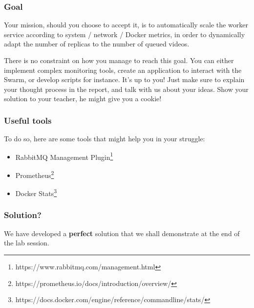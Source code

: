 \documentclass[a4paper,11pt]{exam}
\begin{document}
\subsubsection{Goal}

Your mission, should you choose to accept it, is to automatically scale the worker service according to system / network / Docker metrics, in order to dynamically adapt the number of replicas to the number of queued videos.

There is no constraint on how you manage to reach this goal.
You can either implement complex monitoring tools, create an application to interact with the Swarm, or develop scripts for instance.
It's up to you!
Just make sure to explain your thought process in the report, and talk with us about your ideas.
Show your solution to your teacher, he might give you a cookie!

\subsubsection{Useful tools}

To do so, here are some tools that might help you in your struggle:

\begin{itemize}

\item RabbitMQ Management Plugin\footnote{https://www.rabbitmq.com/management.html}

\item Prometheus\footnote{https://prometheus.io/docs/introduction/overview/}

\item Docker Stats\footnote{https://docs.docker.com/engine/reference/commandline/stats/}

\end{itemize}

\subsubsection{Solution?}

We have developed a \textbf{perfect} solution that we shall demonstrate at the end of the lab session.
\end{document}
